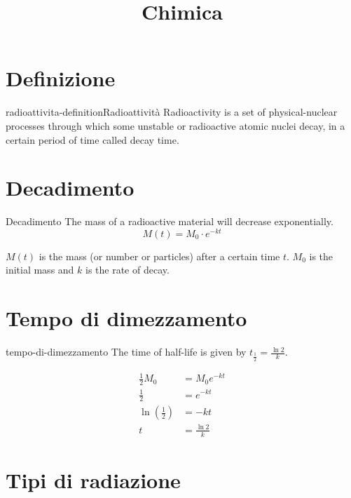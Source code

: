 \documentclass[preview]{standalone}
\begin{document}
\title{Chimica}
\genpage

\section{Definizione}

\begin{snippetdefinition}{radioattivita-definition}{Radioattività}
    Radioactivity is a set of physical-nuclear processes
through which some unstable or radioactive atomic nuclei decay,
in a certain period of time called decay time.
\end{snippetdefinition}


\section{Decadimento}

\begin{snippet}{Decadimento}
    The mass of a radioactive material will decrease exponentially.
    \[
        M(t) = M_0 \cdot e^{-kt}
    \]

    \(M(t)\) is the mass (or number or particles)
    after a certain time \(t\). \(M_0\) is the initial mass
    and \(k\) is the rate of decay.
\end{snippet}

\section{Tempo di dimezzamento}

\begin{snippet}{tempo-di-dimezzamento}
    The time of half-life is given by \(t_\frac{1}{2} = \frac{\ln 2}{k}\).

    \begin{align*}
        \frac{1}{2}M_0 &= M_0 e^{-kt} \\
        \frac{1}{2} &= e^{-kt} \\
        \ln\left(\frac{1}{2}\right) &= -kt \\
        t &= \frac{\ln 2}{k}
    \end{align*}
\end{snippet}

\section{Tipi di radiazione}
\end{document}
